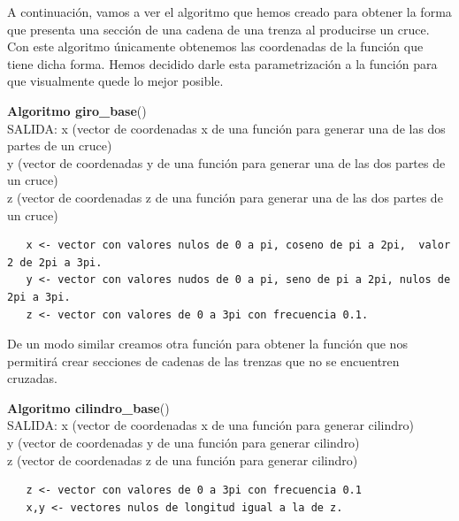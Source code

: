  A continuación, vamos a ver el algoritmo que hemos creado para obtener la forma que presenta una sección de una cadena de una trenza al producirse un cruce. Con este algoritmo únicamente obtenemos las coordenadas de la función que tiene dicha forma. Hemos decidido darle esta parametrización a la función para que visualmente quede lo mejor posible. 
 
  \begin{alg}
  	\textbf{Algoritmo giro\_base}()\\
  	SALIDA: \hspace{0.4cm} x (vector de coordenadas x de una función para generar una de las dos partes de un cruce)\\
  	\hspace*{2.2cm} y (vector de coordenadas y de una función para generar una de las dos partes de un cruce)\\
  	\hspace*{2.2cm} z (vector de coordenadas z de una función para generar una de las dos partes de un cruce)
  	
\begin{lstlisting}
   x <- vector con valores nulos de 0 a pi, coseno de pi a 2pi,  valor 2 de 2pi a 3pi.
   y <- vector con valores nudos de 0 a pi, seno de pi a 2pi, nulos de 2pi a 3pi.
   z <- vector con valores de 0 a 3pi con frecuencia 0.1.
\end{lstlisting}
  \end{alg}
  
  De un modo similar creamos otra función para obtener la función que nos permitirá crear secciones de cadenas de las trenzas que no se encuentren cruzadas. 
 \begin{alg}
 	\textbf{Algoritmo cilindro\_base}()\\
 	SALIDA: \hspace{0.4cm} x (vector de coordenadas x de una función para generar cilindro)\\
 	\hspace*{2.2cm} y (vector de coordenadas y de una función para generar cilindro)\\
 	\hspace*{2.2cm} z (vector de coordenadas z de una función para generar cilindro)
 	
\begin{lstlisting}
   z <- vector con valores de 0 a 3pi con frecuencia 0.1
   x,y <- vectores nulos de longitud igual a la de z. 
\end{lstlisting}
 \end{alg}
 
